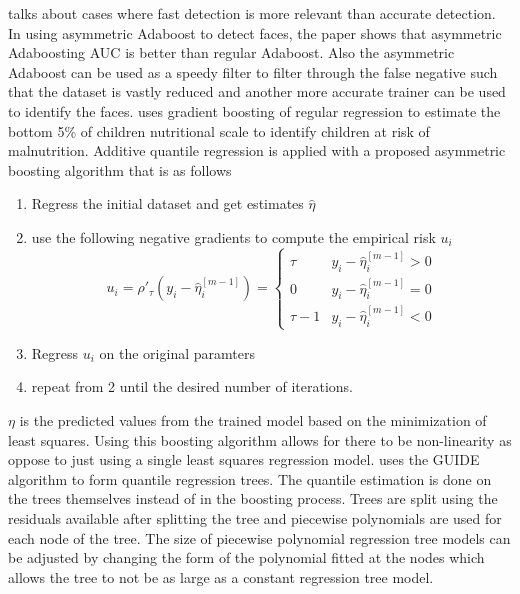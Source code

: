\citet{Viola06} talks about cases where fast detection is more relevant than accurate detection. In using asymmetric Adaboost to detect faces, the paper shows that asymmetric Adaboosting AUC is better than regular Adaboost. Also the asymmetric Adaboost can be used as a speedy filter to filter through the false negative such that the dataset is vastly reduced and another more accurate trainer can be used to identify the faces. \citet{Fenske09} uses gradient boosting of regular regression to estimate the bottom 5\% of children nutritional scale to identify children at risk of malnutrition. Additive quantile regression is applied \citep{Lee05} with a proposed asymmetric boosting algorithm that is as follows
\begin{enumerate}
	\item Regress the initial dataset and get estimates $\hat{\eta}$
	\item use the following negative gradients to compute the empirical risk $u_i$
	\begin{equation}
		u_i=\rho'_\tau (y_i -\hat{\eta}_i^{[m-1]})=\begin{cases} \tau & y_i-\hat{\eta}_i^{[m-1]} >0
		\\
		0 &y_i-\hat{\eta}_i^{[m-1]} =0
		\\
		\tau - 1 & y_i-\hat{\eta}_i^{[m-1]} <0
		\end{cases}	
	\end{equation}
	\item Regress $u_i$ on the original paramters
	\item repeat from 2 until the desired number of iterations. 
\end{enumerate}

$\eta$ is the predicted values from the trained model based on the minimization of least squares. Using this boosting algorithm allows for there to be non-linearity as oppose to just using a single least squares regression model. \citet{Chaudhuri02} uses the GUIDE algorithm \citep{Chaudhuri95} to form quantile regression trees. The quantile estimation is done on the trees themselves instead of in the boosting process. Trees are split using the residuals available after splitting the tree and piecewise polynomials are used for each node of the tree. The size of piecewise polynomial regression tree models can be adjusted by changing the form of the polynomial fitted at the nodes which allows the tree to not be as large as a constant regression tree model. 

